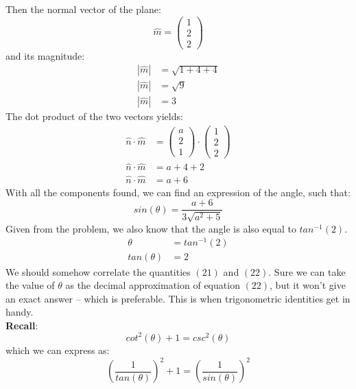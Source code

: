 \documentclass[hidelinks, a4paper, 12pt]{article}
\newcommand{\bd}{\textbf}
\newcommand{\nhat}{\hat{n}}
\newcommand{\mhat}{\hat{m}}
\newcommand{\n}{\\[\baselineskip]}
\begin{document}
            Then the normal vector of the plane:
            \[\mhat = \begin{pmatrix} 1 \\ 2 \\ 2 \end{pmatrix}\]
            and its magnitude:
            \[\begin{split}
                |\mhat| &= \sqrt{1 + 4 + 4}\\
                |\mhat| &= \sqrt{9}\\
                |\mhat| &= 3
            \end{split}\]
            The dot product of the two vectors yields:
            \[\begin{split}
                \nhat \cdot \mhat &= \begin{pmatrix} a \\ 2 \\ 1 \end{pmatrix} \cdot \begin{pmatrix} 1 \\ 2 \\ 2 \end{pmatrix}\\
                \nhat \cdot \mhat &= a + 4 + 2\\
                \nhat \cdot \mhat &= a + 6
            \end{split}\]
            With all the components found, we can find an expression of the angle, such that:
            \begin{equation}sin(\theta) = \frac{a + 6}{3\sqrt{a^2 + 5}}\end{equation}
            Given from the problem, we also know that the angle is also equal to $tan^{-1}(2)$.
            \begin{equation}
                \begin{split}
                    \theta &= tan^{-1}(2)\\
                    tan(\theta) &= 2
                \end{split}
            \end{equation}
            We should somehow correlate the quantities $(21)$ and $(22)$. Sure we can take the value of $\theta$ as the decimal approximation
            of equation $(22)$, but it won't give an exact answer -- which is preferable. This is when trigonometric identities get in handy.\n
            \bd{Recall}:
            \[cot^{2}(\theta) + 1 = csc^{2}(\theta)\]
            which we can express as:
            \[\left(\frac{1}{tan(\theta)}\right)^2 + 1 = \left(\frac{1}{sin(\theta)}\right)^2\]
\end{document}
